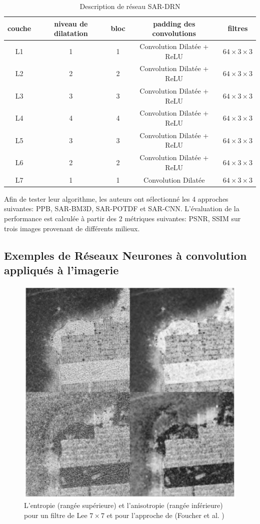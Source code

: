 \begin{table}[h!]
\begin{center}
 \begin{tabular}{||c c c c c||} 
 \hline
couche & niveau de dilatation & bloc & padding des convolutions & filtres \\ [0.5ex] 
 \hline
L1 & 1 & 1 & Convolution Dilatée + ReLU & $64 \times 3 \times 3$\\
L2 & 2 & 2 & Convolution Dilatée + ReLU  &$64 \times 3 \times 3$    \\
L3 & 3 & 3 & Convolution Dilatée + ReLU & $64 \times 3 \times 3$    \\
L4 & 4 & 4 & Convolution Dilatée + ReLU & $64 \times 3 \times 3$    \\
L5 & 3 & 3 & Convolution Dilatée + ReLU & $64 \times 3 \times 3$    \\
L6 & 2 & 2 & Convolution Dilatée + ReLU & $64 \times 3 \times 3$    \\
L7 & 1 & 1 & Convolution Dilatée  & $64 \times 3 \times 3$    \\
  \hline
\end{tabular}
\end{center}
  \caption{Description de réseau SAR-DRN}
  \label{tab:conf-SAR-DRN}
\end{table}

Afin de tester leur algorithme, les auteurs ont sélectionné les 4 approches suivantes: PPB, SAR-BM3D, SAR-POTDF et SAR-CNN. L'évaluation de la performance est calculée à partir des 2 métriques suivantes: PSNR, SSIM sur trois images provenant de différents milieux.  

\subsection{Exemples de Réseaux Neurones à convolution appliqués à l'imagerie \acrpolsar}

\begin{figure}
  \includegraphics[width=0.5\linewidth]{figures/geo6393/test-foucher2017.jpg}
   \centering
  \caption{L'entropie (rangée supérieure) et l'anisotropie (rangée inférieure) pour un filtre de Lee $7 \times 7$ et pour l'approche de (Foucher et al. \cite{Foucher2017})}
  \label{fig:foucher2017}
\end{figure}


